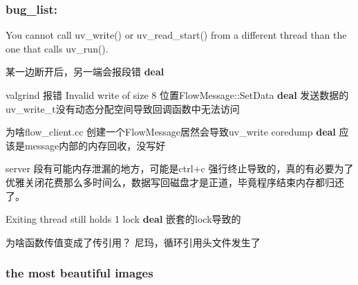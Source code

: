 \subsubsection*{bug\+\_\+list\+:}


\begin{DoxyEnumerate}
\item You cannot call uv\+\_\+write() or uv\+\_\+read\+\_\+start() from a different thread than the one that calls uv\+\_\+run().
\item 某一边断开后，另一端会报段错 {\bfseries deal}
\item valgrind 报错 Invalid write of size 8 位置\+Flow\+Message\+::\+Set\+Data {\bfseries deal} 发送数据的 uv\+\_\+write\+\_\+t没有动态分配空间导致回调函数中无法访问
\item 为啥flow\+\_\+client.\+cc 创建一个\+Flow\+Message居然会导致uv\+\_\+write coredump {\bfseries deal} 应该是message内部的内存回收，没写好
\item server 段有可能内存泄漏的地方，可能是ctrl+c 强行终止导致的，真的有必要为了优雅关闭花费那么多时间么，数据写回磁盘才是正道，毕竟程序结束内存都归还了。
\item Exiting thread still holds 1 lock {\bfseries deal} 嵌套的lock导致的
\item 为啥函数传值变成了传引用？ 尼玛，循环引用头文件发生了 \subsubsection*{the most beautiful images}
\end{DoxyEnumerate}

 